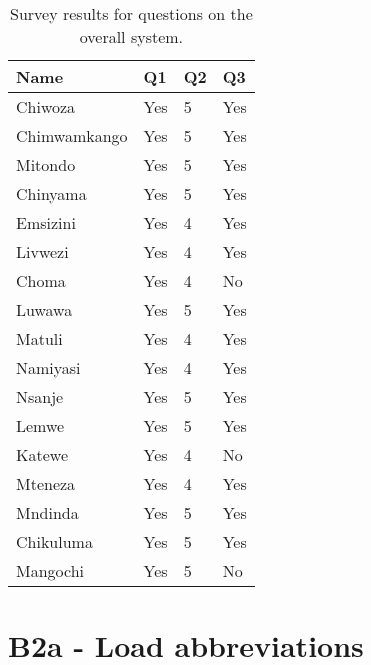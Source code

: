 \begin{table}[ht!]
\centering
    \begin{tabular}{ m{4cm} m{1.5cm} m{1.5cm} m{1.5cm} } 
    \toprule
    \toprule
    \textbf{Name} &  \textbf{Q1} & \textbf{Q2} & \textbf{Q3} \\
    \midrule
    Chiwoza         & Yes & 5 & Yes  \\
    Chimwamkango    & Yes & 5 & Yes  \\
    Mitondo         & Yes & 5 & Yes  \\
    Chinyama        & Yes & 5 & Yes  \\
    Emsizini        & Yes & 4 & Yes  \\
    Livwezi         & Yes & 4 & Yes  \\
    Choma           & Yes & 4 & No  \\
    Luwawa          & Yes & 5 & Yes  \\
    Matuli          & Yes & 4 & Yes  \\
    Namiyasi        & Yes & 4 & Yes \\
    Nsanje          & Yes & 5 & Yes  \\
    Lemwe           & Yes & 5 & Yes  \\
    Katewe          & Yes & 4 & No  \\
    Mteneza         & Yes & 4 & Yes  \\
    Mndinda         & Yes & 5 & Yes  \\
    Chikuluma       & Yes & 5 & Yes  \\
    Mangochi        & Yes & 5 & No  \\
    
    \bottomrule
    \bottomrule
    \end{tabular}
\caption[User survey- overall system]{Survey results for questions on the overall system.}
\end{table}


\newpage
\section*{\large{B2a - Load abbreviations}}
\vspace*{1cm}

